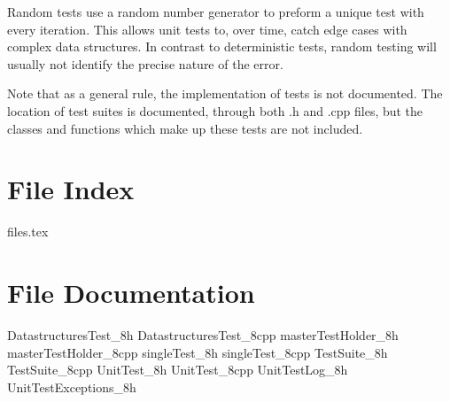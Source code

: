 	Random tests use a random number generator to preform a unique test with every iteration.  This allows unit tests to, over time, catch edge cases with complex data structures.  In contrast to deterministic tests, random testing will usually not identify the precise nature of the error.

	Note that as a general rule, the implementation of tests is not documented.  The location of test suites is documented, through both .h and .cpp files, but the classes and functions which make up these tests are not included.

	\renewcommand{\DOXYGENFOLDER}{../../UnitTest/Documentation/doxygenFiles/latex/}
	\chapter{File Index}
		{files.tex}
		
	\chapter{File Documentation}
		{DatastructuresTest_8h}
		{DatastructuresTest_8cpp}
		{masterTestHolder_8h}
		{masterTestHolder_8cpp}
		{singleTest_8h}
		{singleTest_8cpp}
		{TestSuite_8h}
		{TestSuite_8cpp}
		{UnitTest_8h}
		{UnitTest_8cpp}
		{UnitTestLog_8h}
		{UnitTestExceptions_8h}
		